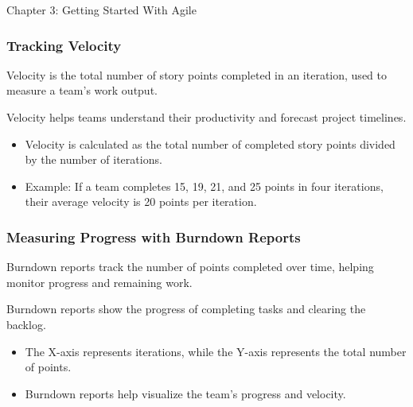 \begin{notes}{Chapter 3: Getting Started With Agile}
\begin{highlight}
    \end{highlight}
    
    \subsubsection*{Tracking Velocity}
    
    Velocity is the total number of story points completed in an iteration, used to measure a team's work output.
    
    \begin{highlight}
    
        Velocity helps teams understand their productivity and forecast project timelines.
        
        \begin{itemize}
            \item Velocity is calculated as the total number of completed story points divided by the number of iterations.
            \item Example: If a team completes 15, 19, 21, and 25 points in four iterations, their average velocity is 20 points per iteration.
        \end{itemize}
    
    \end{highlight}
    
    \subsubsection*{Measuring Progress with Burndown Reports}
    
    Burndown reports track the number of points completed over time, helping monitor progress and remaining work.
    
    \begin{highlight}
    
        Burndown reports show the progress of completing tasks and clearing the backlog.
        
        \begin{itemize}
            \item The X-axis represents iterations, while the Y-axis represents the total number of points.
            \item Burndown reports help visualize the team's progress and velocity.
        \end{itemize}
    
    \end{highlight}
    

\end{notes}
